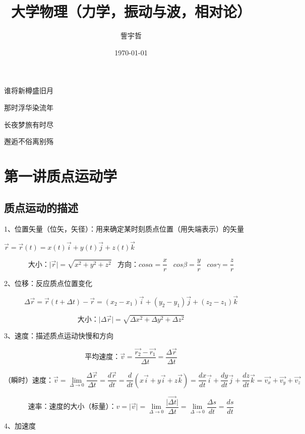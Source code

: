 \documentclass[UTF8]{article}
\begin{document}
\title{大学物理（力学，振动与波，相对论）}
\author{訾宇哲}
\date{\today}
\maketitle
\newpage
\tableofcontents
\newpage
\begin{center}
谁将新樽盛旧月

那时浮华染流年

长夜梦旅有时尽

邂逅不俗离别殇
\end{center}
\newpage
\section{第一讲\;\;质点运动学}
\subsection{质点运动的描述}

    1、位置矢量（位矢，矢径）：用来确定某时刻质点位置（用失端表示）的矢量

    \;\;$\vec{r} = \vec{r}(t) = x(t)\vec{i}+y(t)\vec{j}+z(t)\vec{k}$

    \;\;\[\mbox{大小：}\lvert\vec{r}\rvert = \sqrt{x^2+y^2+z^2}\;\;\;\mbox{方向：}cos\alpha = \frac{x}{r}\;\;\;cos\beta = \frac{y}{r}\;\;\;cos\gamma = \frac{z}{r}\]

    2、位移：反应质点位置变化

    \[\Delta \vec{r} = \vec{r}(t + \Delta t) - \vec{r} = (x_2 - x_1)\vec{i} + (y_2-y_1)\vec{j} + (z_2 - z_1)\vec{k}\]

    \[\mbox{大小：}\lvert\Delta\vec{r}\rvert = \sqrt{\Delta x^2 + \Delta y^2 + \Delta z^2}\]

    3、速度：描述质点运动快慢和方向

    \[\mbox{平均速度：}\vec{v} = \frac{\vec{r_2} - \vec{r_1}}{\Delta t}  = \frac{\Delta \vec{r}}{\Delta t}\]

    \[\mbox{（瞬时）速度：}\vec{v} = \lim_{\Delta \rightarrow 0}\frac{\Delta \vec{r}}{\Delta t} = \frac{d\vec{r}}{dt} = \frac{d}{dt}(x\vec{i}+y\vec{i}+z\vec{k}) = \frac{dx}{dt}\vec{i}+\frac{dy}{dt}\vec{j}+\frac{dz}{dt}\vec{k} = \vec{v_x}+\vec{v_y}+\vec{v_z}\]

    \[\mbox{速率：速度的大小（标量）：}v = \lvert\vec{v}\rvert = \lim_{\Delta \rightarrow 0}\frac{\lvert\vec{\Delta t}\rvert}{\Delta t} = \lim_{\Delta \rightarrow 0}\frac{\Delta s}{dt} = \frac{ds}{dt}\]

    4、加速度
\end{document}
